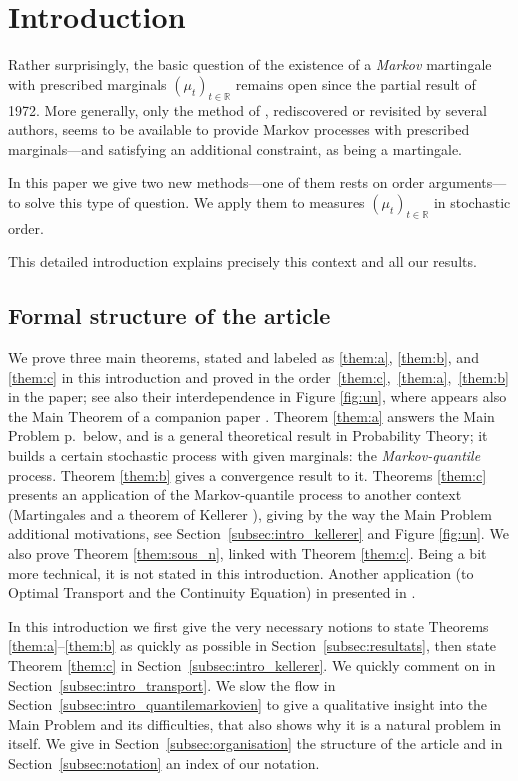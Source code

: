 \documentclass[11pt]{article}
\theoremstyle{plain}
\theoremstyle{definition}
\newcommand{\R}{\mathbb{R}}
\begin{document}
\section{Introduction}\label{sec:intro}
Rather surprisingly, the basic question of the existence of a \emph{Markov} martingale with prescribed marginals $(\mu_t)_{t\in\R}$ remains open since the partial result \cite{Ke72} of 1972. More generally, only the method of \cite{Ke72}, rediscovered or revisited by several authors, seems to be available to provide Markov processes with prescribed marginals---and satisfying an additional constraint, as being a martingale.

In this paper we give two new methods---one of them rests on order arguments---to solve this type of question. We apply them to measures $(\mu_t)_{t\in\R}$ in stochastic order.

This detailed introduction explains precisely this context and all our results.

\subsection{Formal structure of the article}\label{subsec:formal} We prove three main theorems, stated and labeled as \ref{them:a}, \ref{them:b}, and \ref{them:c} in this introduction and proved in the order~\ref{them:c},~\ref{them:a},~\ref{them:b} in the paper; see also their interdependence in Figure \ref{fig:un}, where appears also the Main Theorem of a companion paper \cite{BouJui2}. Theorem \ref{them:a} answers the Main Problem p.\,\pageref{problem} below, and is a general theoretical result in Probability Theory; it builds a certain stochastic process with given marginals: the \emph{Markov-quantile} process. Theorem \ref{them:b} gives a convergence result to it. Theorems \ref{them:c} presents an application of the Markov-quantile process to another context (Martingales and a theorem of Kellerer \cite{Ke72,Ke73}), giving by the way the Main Problem additional motivations, see Section~\ref{subsec:intro_kellerer} and Figure \ref{fig:un}. We also prove Theorem \ref{them:sous_n}, linked with Theorem \ref{them:c}. Being a bit more technical, it is not stated in this introduction. Another application (to Optimal Transport and the Continuity Equation) in presented in \cite{BouJui2}.

In this introduction we first give the very necessary notions to state Theorems \ref{them:a}--\ref{them:b} as quickly as possible in Section~\ref{subsec:resultats}, then state Theorem \ref{them:c} in Section~\ref{subsec:intro_kellerer}. We quickly comment on \cite{BouJui2} in Section~\ref{subsec:intro_transport}. We slow the flow in Section~\ref{subsec:intro_quantilemarkovien} to give a qualitative insight into the Main Problem and its difficulties, that also shows why it is a natural problem in itself. We give in Section~\ref{subsec:organisation} the structure of the article and in Section~\ref{subsec:notation} an index of our notation.
\end{document}
